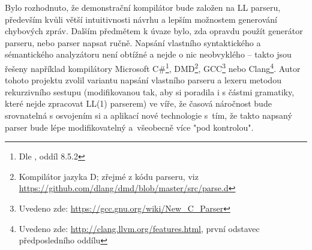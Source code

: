  Bylo rozhodnuto, že demonstrační kompilátor bude založen na LL parseru, především kvůli větší intuitivnosti návrhu a lepším možnostem generování chybových zpráv. Dalším předmětem k úvaze bylo, zda opravdu použít generátor parseru, nebo parser napsat ručně. Napsání vlastního syntaktického a sémantického analyzátoru není obtížné a nejde o nic neobvyklého -- takto jsou řešeny například kompilátory Microsoft C\#\footnote{Dle \cite{JavaCompilerConstructionCampbell}, oddíl 8.5.2}, DMD\footnote{Kompilátor jazyka D; zřejmé z kódu parseru, viz \url{https://github.com/dlang/dmd/blob/master/src/parse.d}}, GCC\footnote{Uvedeno zde: \url{https://gcc.gnu.org/wiki/New_C_Parser}} nebo Clang\footnote{Uvedeno zde: \url{http://clang.llvm.org/features.html}, první odstavec předposledního oddílu}. Autor tohoto projektu zvolil variantu napsání vlastního parseru a lexeru metodou rekurzivního sestupu (modifikovanou tak, aby si poradila i s částmi gramatiky, které nejde zpracovat LL(1) parserem) ve víře, že časová náročnost bude srovnatelná s osvojením si a aplikací nové technologie s~tím, že takto napsaný parser bude lépe modifikovatelný a~všeobecně více "pod kontrolou".

